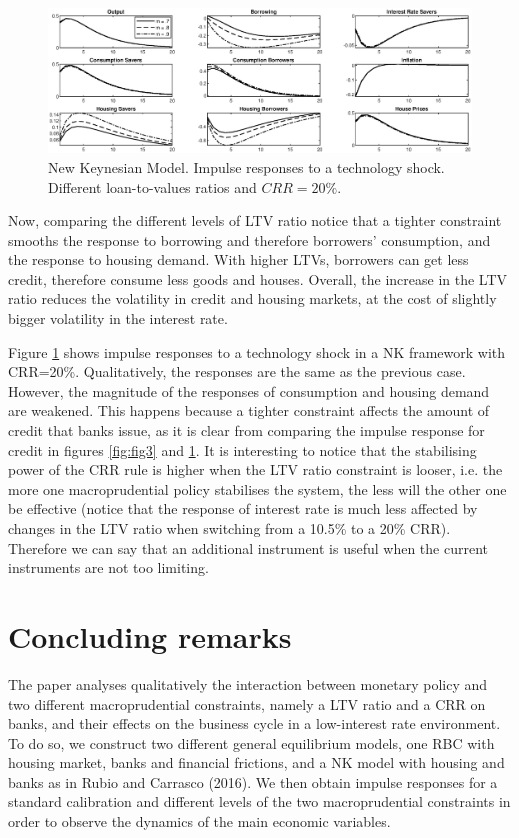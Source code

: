 \documentclass[final,3p,times,twocolumn]{elsarticle}
\begin{document}
\begin{figure}[ht]
\centering
  \includegraphics[width=\linewidth]{fig4_nk_crr_20.eps}
  \caption{New Keynesian Model. Impulse responses to a technology shock. Different loan-to-values ratios and $CRR=20\%$.}
    \label{fig:fig4}
\end{figure}

Now, comparing the different levels of LTV ratio notice that a tighter constraint smooths the response to borrowing and therefore borrowers’ consumption, and the response to housing demand. With higher LTVs, borrowers can get less credit, therefore consume less goods and houses. Overall, the increase in the LTV ratio reduces the volatility in credit and housing markets, at the cost of slightly bigger volatility in the interest rate.\par

Figure \ref{fig:fig4} shows impulse responses to a technology shock in a NK framework with CRR=20\%.
Qualitatively, the responses are the same as the previous case. However, the magnitude of the responses of consumption and housing demand are weakened. This happens because a tighter constraint affects the amount of credit that banks issue, as it is clear from comparing the impulse response for credit in figures \ref{fig:fig3} and \ref{fig:fig4}. It is interesting to notice that the stabilising power of the CRR rule is higher when the LTV ratio constraint is looser, i.e. the more one macroprudential policy stabilises the system, the less will the other one be effective (notice that the response of interest rate is much less affected by changes in the LTV ratio when switching from a 10.5\% to a 20\% CRR). Therefore we can say that an additional instrument is useful when the current instruments are not too limiting.\par

\section{Concluding remarks}

The paper analyses qualitatively the interaction between monetary policy and two different macroprudential constraints, namely a LTV ratio and a CRR on banks, and their effects on the business cycle in a low-interest rate environment. To do so, we construct two different general equilibrium models, one RBC with housing market, banks and financial frictions, and a NK model with housing and banks as in Rubio and Carrasco (2016). We then obtain impulse responses for a standard calibration and different levels of the two macroprudential constraints in order to observe the dynamics of the main economic variables.\par
\end{document}
